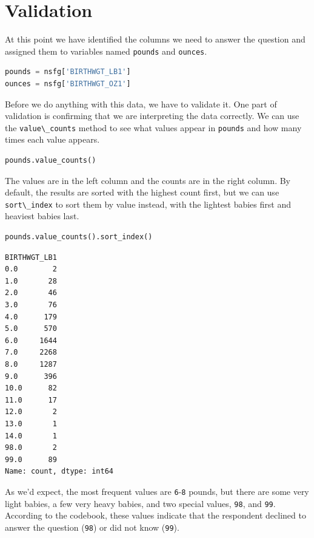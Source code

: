 \hypertarget{validation}{%
\section{Validation}\label{validation}}

At this point we have identified the columns we need to answer the
question and assigned them to variables named
\passthrough{\lstinline!pounds!} and \passthrough{\lstinline!ounces!}.

\begin{lstlisting}[language=Python,style=source]
pounds = nsfg['BIRTHWGT_LB1']
ounces = nsfg['BIRTHWGT_OZ1']
\end{lstlisting}

Before we do anything with this data, we have to validate it. One part
of validation is confirming that we are interpreting the data correctly.
We can use the \passthrough{\lstinline!value\_counts!} method to see
what values appear in \passthrough{\lstinline!pounds!} and how many
times each value appears.

\begin{lstlisting}[language=Python,style=source]
pounds.value_counts()
\end{lstlisting}

The values are in the left column and the counts are in the right
column. By default, the results are sorted with the highest count first,
but we can use \passthrough{\lstinline!sort\_index!} to sort them by
value instead, with the lightest babies first and heaviest babies last.

\begin{lstlisting}[language=Python,style=source]
pounds.value_counts().sort_index()
\end{lstlisting}

\begin{lstlisting}[style=output]
BIRTHWGT_LB1
0.0        2
1.0       28
2.0       46
3.0       76
4.0      179
5.0      570
6.0     1644
7.0     2268
8.0     1287
9.0      396
10.0      82
11.0      17
12.0       2
13.0       1
14.0       1
98.0       2
99.0      89
Name: count, dtype: int64
\end{lstlisting}

As we'd expect, the most frequent values are
\passthrough{\lstinline!6!}-\passthrough{\lstinline!8!} pounds, but
there are some very light babies, a few very heavy babies, and two
special values, \passthrough{\lstinline!98!}, and
\passthrough{\lstinline!99!}. According to the codebook, these values
indicate that the respondent declined to answer the question
(\passthrough{\lstinline!98!}) or did not know
(\passthrough{\lstinline!99!}).

